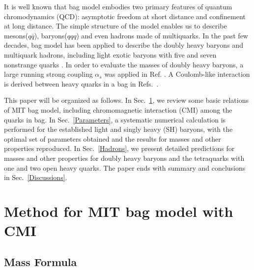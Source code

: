 \documentclass[12pt,prd,onecolumn,floatfix,nofootinbib]{revtex4}
\begin{document}
It is well known that bag model \cite{DeGrand:1975cf} embodies two primary
features of quantum chromodynamics (QCD): asymptotic freedom at short
distance and confinement at long distance. The simple structure of the model
enables us to describe mesons($q\bar{q}$), baryons($qqq$) and even hadrons
made of multiquarks. In the past few decades, bag model has been applied to
describe the doubly heavy baryons\cite%
{Fleck:1989mb,He:2004px,Bernotas:2012nz} and multiquark hadrons, including
light exotic baryons with five and seven nonstrange quarks \cite%
{Strottman:1979qu}. In order to evaluate the masses of doubly heavy baryons,
a large running strong coupling $\alpha _{s}$ was applied in Ref. \cite%
{He:2004px}. A Coulomb-like interaction is derived between heavy quarks in a
bag in Refs.~\cite{Haxton:1980mc,Aerts:1980rf}.

This paper will be organized as follows. In Sec.~\ref{Method}, we review
some basic relations of MIT bag model, including chromomagnetic interaction
(CMI) among the quarks in bag. In Sec.~\ref{Parameters}, a systematic
numerical calculation is performed for the established light and singly
heavy (SH) baryons, with the optimal set of parameters obtained and the results
for masses and other properties reproduced. In Sec.~\ref{Hadrons}, we
present detailed predictions for masses and other properties for doubly
heavy baryons and the tetraquarks with one and two open heavy quarks. The
paper ends with summary and conclusions in Sec.~\ref{Discussions}.

\section{Method for MIT bag model with CMI}

\label{Method}

\subsection{Mass Formula}
\end{document}
